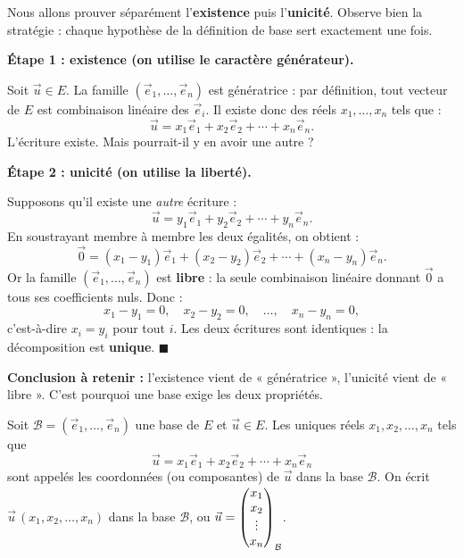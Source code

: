 \documentclass[11pt]{article}
\newcommand{\cle}[1]{{\popxbold\color{popdark}#1}}
\def\vdots{\mathord{\vbox{\baselineskip3.2pt\lineskiplimit0pt\kern4pt\hbox{.}\hbox{.}\hbox{.}}}}%
\begin{document}
\begin{experience}
Nous allons prouver séparément l'\textbf{existence} puis l'\textbf{unicité}. Observe bien la stratégie : chaque hypothèse de la définition de base sert exactement une fois.

\textbf{Étape 1 : existence (on utilise le caractère générateur).}

Soit $\vec{u} \in E$. La famille $(\vec{e}_1, \ldots, \vec{e}_n)$ est génératrice : par définition, tout vecteur de $E$ est combinaison linéaire des $\vec{e}_i$. Il existe donc des réels $x_1, \ldots, x_n$ tels que :
\[ \vec{u} = x_1 \vec{e}_1 + x_2 \vec{e}_2 + \cdots + x_n \vec{e}_n. \]
L'écriture existe. Mais pourrait-il y en avoir une autre ?

\textbf{Étape 2 : unicité (on utilise la liberté).}

Supposons qu'il existe une \emph{autre} écriture :
\[ \vec{u} = y_1 \vec{e}_1 + y_2 \vec{e}_2 + \cdots + y_n \vec{e}_n. \]
En soustrayant membre à membre les deux égalités, on obtient :
\[ \vec{0} = (x_1 - y_1)\vec{e}_1 + (x_2 - y_2)\vec{e}_2 + \cdots + (x_n - y_n)\vec{e}_n. \]
Or la famille $(\vec{e}_1, \ldots, \vec{e}_n)$ est \textbf{libre} : la seule combinaison linéaire donnant $\vec{0}$ a tous ses coefficients nuls. Donc :
\[ x_1 - y_1 = 0, \quad x_2 - y_2 = 0, \quad \ldots, \quad x_n - y_n = 0, \]
c'est-à-dire $x_i = y_i$ pour tout $i$. Les deux écritures sont identiques : la décomposition est \textbf{unique}. $\blacksquare$

\textbf{Conclusion à retenir :} l'existence vient de « génératrice », l'unicité vient de « libre ». C'est pourquoi une base exige les deux propriétés.
\end{experience}

\begin{definition}
Soit $\mathcal{B} = (\vec{e}_1, \ldots, \vec{e}_n)$ une base de $E$ et $\vec{u} \in E$. Les uniques réels $x_1, x_2, \ldots, x_n$ tels que
\[ \vec{u} = x_1 \vec{e}_1 + x_2 \vec{e}_2 + \cdots + x_n \vec{e}_n \]
sont appelés les \cle{coordonnées} (ou \cle{composantes}) de $\vec{u}$ dans la base $\mathcal{B}$. On écrit $\vec{u}\,(x_1, x_2, \ldots, x_n)$ dans la base $\mathcal{B}$, ou $\vec{u} = \begin{pmatrix} x_1 \\ x_2 \\ \vdots \\ x_n \end{pmatrix}_{\mathcal{B}}$.
\end{definition}
\end{document}
